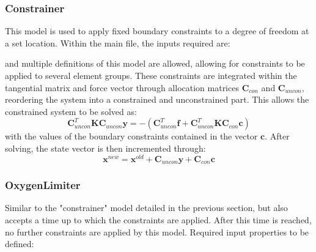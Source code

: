 \documentclass[3p]{elsarticle} %
\begin{document}
\subsubsection{Constrainer}
This model is used to apply fixed boundary constraints to a degree of freedom at a set location. Within the main file, the inputs required are:

and multiple definitions of this model are allowed, allowing for constraints to be applied to several element groups. These constraints are integrated within the tangential matrix and force vector through  allocation matrices $\bm{C}_{con}$ and $\bm{C}_{uncon}$, reordering the system into a constrained and unconstrained part. This allows the constrained system to be solved as:
\begin{equation}
	\bm{C}_{uncon}^T \bm{K} \bm{C}_{uncon} \mathbf{y} = -\left(\bm{C}_{uncon}^T\bm{f}+\bm{C}_{uncon}^T \bm{K} \bm{C}_{con}\mathbf{c}\right)
\end{equation}
with the values of the boundary constraints contained in the vector $\mathbf{c}$. After solving, the state vector is then incremented through:
\begin{equation}
	\mathbf{x}^{new} = \mathbf{x}^{old} + \bm{C}_{uncon}\mathbf{y} + \bm{C}_{con}\mathbf{c}
\end{equation}

\subsubsection{OxygenLimiter}
Similar to the "constrainer" model detailed in the previous section, but also accepts a time up to which the constraints are applied. After this time is reached, no further constraints are applied by this model. Required input properties to be defined:

\end{document}
